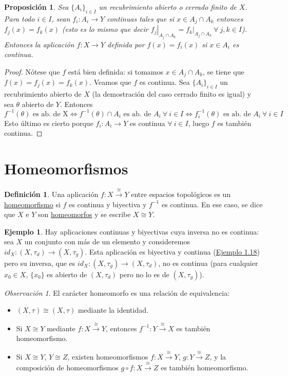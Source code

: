 \documentclass[12pt]{report}
\newtheorem{proposition}{Proposición}[chapter]
\theoremstyle{definition}
\newtheorem{definition}{Definición}[chapter]
\theoremstyle{definition}
\newtheorem{example}{Ejemplo}[chapter]
\theoremstyle{remark}
\newtheorem*{obs}{Observación} %
\begin{document}
\begin{proposition}
\label{prop1.16.}
Sea $\{A_i\}_{i \in I}$ un recubrimiento abierto o cerrado finito de $X$. Para todo $i \in I$, sean $f_i \colon A_i \to Y$ continuas tales que si $x \in A_j \cap A_k$ entonces $f_j(x) = f_k(x)$ (esto es lo mismo que decir $\left.f_j\right|_{A_j \cap A_k} = \left.f_k\right|_{A_j \cap A_k} \ \forall \ j,k \in I$). Entonces la aplicación $f \colon X \to Y$ definida por $f(x) = f_i(x)$ si $x \in A_i$ es continua.

\end{proposition}
\begin{proof}
Nótese que $f$ está bien definida: si tomamos $x \in A_j \cap A_k$, se tiene que $f(x) = f_j(x) = f_k(x)$. Veamos que $f$ es continua. Sea $\{A_i\}_{i \in I}$ un recubrimiento abierto de $X$ (la demostración del caso cerrado finito es igual) y sea $\theta$ abierto de $Y$. Entonces \[f^{-1}(\theta) \textrm{ es ab. de X} \iff f^{-1}(\theta) \cap A_i \textrm{ es ab. de } A_i \ \forall \ i \in I \iff f_i^{-1}(\theta) \textrm{ es ab. de } A_i \ \forall \ i \in I\] Esto último es cierto porque $f_i \colon A_i \to Y$ es continua $\forall \ i \in I$, luego $f$ es también continua.
\end{proof}

\section{Homeomorfismos}
\begin{definition}
Una aplicación $f \colon X \xrightarrow{\cong} Y$ entre espacios topológicos es un \underline{homeomorfismo} si $f$ es continua y biyectiva y $f^{-1}$ es continua. En ese caso, se dice que $X$ e $Y$ son \underline{homeomorfos} y se escribe $X \cong Y$.
\end{definition}

\begin{example}
Hay aplicaciones continuas y biyectivas cuya inversa no es continua: sea $X$ un conjunto con más de un elemento y consideremos $id_X \colon (X,\tau_d) \to (X,\tau_g)$. Esta aplicación es biyectiva y continua (\hyperref[ex1.18.]{\color{blue}Ejemplo 1.18}) pero su inversa, que es $id_X \colon (X,\tau_g) \to (X,\tau_d)$, no es continua (para cualquier $x_0 \in X$, $\{x_0\}$ es abierto de $(X,\tau_d)$ pero no lo es de $(X,\tau_g)$).
\end{example}

\begin{obs}
El carácter homeomorfo es una relación de equivalencia:
\begin{itemize}
    \item $(X,\tau) \cong (X,\tau)$ mediante la identidad.
    \item Si $X \cong Y$ mediante $f \colon X \xrightarrow{\cong} Y$, entonces $f^{-1} \colon Y \xrightarrow{\cong} X$ es también homeomorfismo.
    \item Si $X \cong Y$, $Y \cong Z$, existen homeomorfismos $f \colon X \xrightarrow{\cong} Y$, $g \colon Y \xrightarrow{\cong} Z$, y la composición de homeomorfismos $g \circ f \colon X \xrightarrow{\cong} Z$ es también homeomorfismo.
\end{itemize}
\end{obs}
\end{document}
